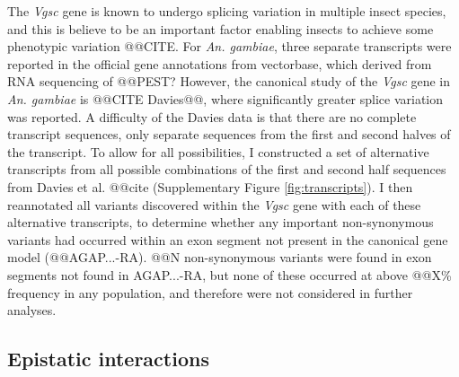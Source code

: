 \documentclass[a4paper,11pt,abstracton,hidelinks]{scrartcl}
\newcommand{\agam}{\textit{An. gambiae}\xspace}
\newcommand{\vgsc}{\textit{Vgsc}\xspace}
\begin{document}
{\begin{landscape}
\begin{table}[h]
\begin{threeparttable}
\begin{tablenotes}
  \end{tablenotes}

  \end{threeparttable}

\end{table}
\end{landscape}
\restoregeometry
} %


%
The \vgsc gene is known to undergo splicing variation in multiple insect species, and this is believe to be an important factor enabling insects to achieve some phenotypic variation @@CITE.
%
For \agam, three separate transcripts were reported in the official gene annotations from vectorbase, which derived from RNA sequencing of @@PEST?
%
However, the canonical study of the \vgsc gene in \agam is @@CITE Davies@@, where significantly greater splice variation was reported.
%
A difficulty of the Davies data is that there are no complete transcript sequences, only separate sequences from the first and second halves of the transcript.
%
To allow for all possibilities, I constructed a set of alternative transcripts from all possible combinations of the first and second half sequences from Davies et al. @@cite (Supplementary Figure \ref{fig:transcripts}).
%
I then reannotated all variants discovered within the \vgsc gene with each of these alternative transcripts, to determine whether any important non-synonymous variants had occurred within an exon segment not present in the canonical gene model (@@AGAP...-RA).
%
@@N non-synonymous variants were found in exon segments not found in AGAP...-RA, but none of these occurred at above @@X\% frequency in any population, and therefore were not considered in further analyses.


\subsection*{Epistatic interactions}
\end{document}
